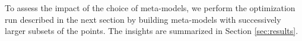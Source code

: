 To assess the impact of the choice of meta-models, we perform the optimization run described in the next section by building meta-models with successively larger subsets of the points. The insights are summarized in Section \ref{sec:results}.
